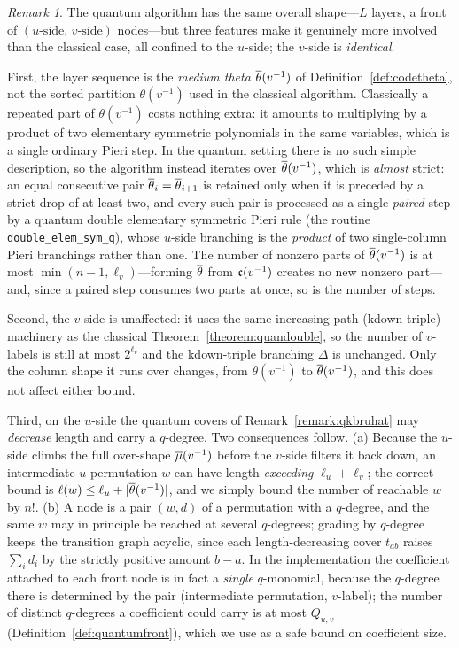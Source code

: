 \documentclass{amsart}
\theoremstyle{definition}
\theoremstyle{remark}
\newtheorem{remark}[lemma]{Remark}
\numberwithin{equation}{section}
\begin{document}
\begin{remark}
The quantum algorithm has the same overall shape---$L$ layers, a front of $(u\text{-side},\,v\text{-side})$ nodes---but three features make it genuinely more involved than the classical case, all confined to the $u$-side; the $v$-side is \emph{identical}.

First, the layer sequence is the \emph{medium theta} $\overline{\theta}(v^{-1})$ of Definition~\ref{def:codetheta}, not the sorted partition $\theta(v^{-1})$ used in the classical algorithm. Classically a repeated part of $\theta(v^{-1})$ costs nothing extra: it amounts to multiplying by a product of two elementary symmetric polynomials in the same variables, which is a single ordinary Pieri step. In the quantum setting there is no such simple description, so the algorithm instead iterates over $\overline{\theta}(v^{-1})$, which is \emph{almost} strict: an equal consecutive pair $\overline{\theta}_i=\overline{\theta}_{i+1}$ is retained only when it is preceded by a strict drop of at least two, and every such pair is processed as a single \emph{paired} step by a quantum double elementary symmetric Pieri rule (the routine \texttt{double\_elem\_sym\_q}), whose $u$-side branching is the \emph{product} of two single-column Pieri branchings rather than one. The number of nonzero parts of $\overline{\theta}(v^{-1})$ is at most $\min(n-1,\ell_v)$---forming $\overline{\theta}$ from $\mathfrak{c}(v^{-1})$ creates no new nonzero part---and, since a paired step consumes two parts at once, so is the number of steps.

Second, the $v$-side is unaffected: it uses the same increasing-path (kdown-triple) machinery as the classical Theorem~\ref{theorem:quandouble}, so the number of $v$-labels is still at most $2^{\ell_v}$ and the kdown-triple branching $\Delta$ is unchanged. Only the column shape it runs over changes, from $\theta(v^{-1})$ to $\overline{\theta}(v^{-1})$, and this does not affect either bound.

Third, on the $u$-side the quantum covers of Remark~\ref{remark:qkbruhat} may \emph{decrease} length and carry a $q$-degree. Two consequences follow. (a) Because the $u$-side climbs the full over-shape $\overline{\mu}(v^{-1})$ before the $v$-side filters it back down, an intermediate $u$-permutation $w$ can have length \emph{exceeding} $\ell_u+\ell_v$; the correct bound is $\ell(w)\leq\ell_u+|\overline{\theta}(v^{-1})|$, and we simply bound the number of reachable $w$ by $n!$. (b) A node is a pair $(w,d)$ of a permutation with a $q$-degree, and the same $w$ may in principle be reached at several $q$-degrees; grading by $q$-degree keeps the transition graph acyclic, since each length-decreasing cover $t_{ab}$ raises $\sum_i d_i$ by the strictly positive amount $b-a$. In the implementation the coefficient attached to each front node is in fact a \emph{single} $q$-monomial, because the $q$-degree there is determined by the pair (intermediate permutation, $v$-label); the number of distinct $q$-degrees a coefficient could carry is at most $Q_{u,v}$ (Definition~\ref{def:quantumfront}), which we use as a safe bound on coefficient size.
\end{remark}
\end{document}
